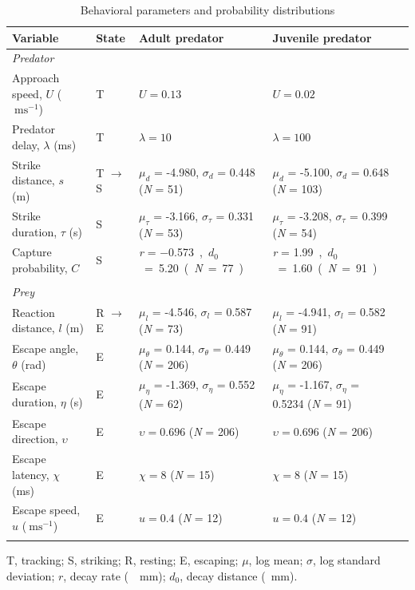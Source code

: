 \documentclass[]{rsos}%
\begin{document}
\linespread{1.3}\selectfont %

\begin{table}[!h]
\scriptsize
\caption{Behavioral parameters and probability distributions}%
\begin{tabular}{lllll}%
\hline
Variable &State &Adult predator & Juvenile predator\\
\hline
\textit{Predator}& & & & \\
Approach speed, $U$ ($\SI{}{\m\s} ^{-1}$) &T &$U = 0.13$ & $U = 0.02$ \\
Predator delay, $\lambda$ (ms) &T &$\lambda = 10$ &$\lambda = 100$ \\
Strike distance, $s$ (m) &T $\to$ S &$\mu_d$ = -4.980, $\sigma_d$ = 0.448 (\textit{N} = 51) & $\mu_d$ = -5.100, $\sigma_d$ = 0.648 (\textit{N} = 103)\\
Strike duration, $\tau$ (s) &S &$\mu_{\tau}$ = -3.166, $\sigma_{\tau}$ = 0.331 (\textit{N} = 53) & $\mu_{\tau}$ = -3.208, $\sigma_{\tau}$ = 0.399 (\textit{N} = 54) \\
Capture probability, $C$ &S &\textit{r} = \SI{-0.573}, \textit{$d_0$} = \SI{5.20}  (\textit{N} = 77) &\textit{r} = \SI{1.99}, \textit{$d_0$} = \SI{1.60}  (\textit{N} = 91) \\ \\
\textit{Prey}& & & & \\
Reaction distance, $l$ (m) &R $\to$ E &$\mu_l$ = -4.546, $\sigma_l$ = 0.587 (\textit{N} = 73) &$\mu_l$ = -4.941, $\sigma_l$ = 0.582 (\textit{N} = 91) \\
Escape angle, $\theta$ (rad) &E  &$\mu_{\theta}$ = 0.144, $\sigma_{\theta}$ = 0.449 (\textit{N} = 206) &$\mu_{\theta}$ = 0.144, $\sigma_{\theta}$ = 0.449 (\textit{N} = 206) \\
Escape duration, $\eta$ (s) &E &$\mu_{\eta}$ = -1.369, $\sigma_{\eta}$ = 0.552 (\textit{N} = 62) &$\mu_{\eta}$ = -1.167, $\sigma_{\eta}$ = 0.5234 (\textit{N} = 91) \\
Escape direction, $\upsilon$ &E &$\upsilon=0.696$ (\textit{N} = 206) &$\upsilon=0.696$ (\textit{N} = 206) \\
Escape latency, $\chi$ (ms) &E &$\chi = 8$ (\textit{N} = 15) & $\chi = 8$ (\textit{N} = 15)\\
Escape speed, $u$ ($\SI{}{\m\s} ^{-1}$) &E  &$u = 0.4$ (\textit{N} = 12) &$u = 0.4$ (\textit{N} = 12) \\\hline
\label{table}
\end{tabular}

T, tracking; S, striking; R, resting; E, escaping; $\mu$, log mean; $\sigma$, log standard deviation; $r$, decay rate (\SI{}{\per\mm}); $d_0$, decay distance (\SI{}{\mm}).
\end{table}%
\end{document}
